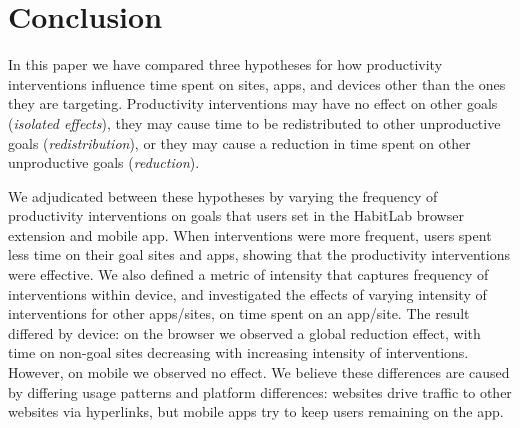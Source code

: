 \section{Conclusion}

In this paper we have compared three hypotheses for how productivity interventions influence time spent on sites, apps, and devices other than the ones they are targeting. Productivity interventions may have no effect on other goals (\textit{isolated effects}), they may cause time to be redistributed to other unproductive goals (\textit{redistribution}), or they may cause a reduction in time spent on other unproductive goals (\textit{reduction}).

We adjudicated between these hypotheses by varying the frequency of productivity interventions on goals that users set in the HabitLab browser extension and mobile app. When interventions were more frequent, users spent less time on their goal sites and apps, showing that the productivity interventions were effective. We also defined a metric of intensity that captures frequency of interventions within device, and investigated the effects of varying intensity of interventions for other apps/sites, on time spent on an app/site. The result differed by device: on the browser we observed a global reduction effect, with time on non-goal sites decreasing with increasing intensity of interventions. However, on mobile we observed no effect. We believe these differences are caused by differing usage patterns and platform differences: websites drive traffic to other websites via hyperlinks, but mobile apps try to keep users remaining on the app. %


